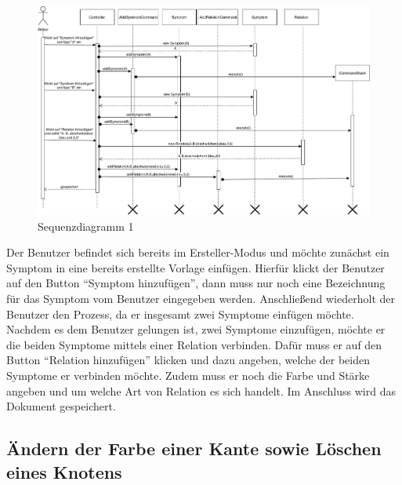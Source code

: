 \documentclass[enabledeprecatedfontcommands,fontsize=12pt,paper=a4,twoside,parskip=half]{scrartcl}
\begin{document}
\begin{figure}[H]
    \centering
    \includegraphics[width=\textwidth]{Bilder/SyndromansatzSWP.pdf}
    \caption{Sequenzdiagramm 1}
    \label{fig:SyndromansatzSWP}
\end{figure}
Der Benutzer befindet sich bereits im Ersteller-Modus und möchte zunächst ein Symptom in eine bereits erstellte Vorlage einfügen. Hierfür klickt der Benutzer auf den Button \enquote{Symptom hinzufügen}, dann muss nur noch eine Bezeichnung für das Symptom vom Benutzer eingegeben werden. Anschließend wiederholt der Benutzer den Prozess, da er insgesamt zwei Symptome einfügen möchte. Nachdem es dem Benutzer gelungen ist, zwei Symptome einzufügen, möchte er die beiden Symptome mittels einer Relation verbinden. Dafür muss er auf den Button \enquote{Relation hinzufügen} klicken und dazu angeben, welche der beiden Symptome er verbinden möchte. Zudem muss er noch die Farbe und Stärke angeben und um welche Art von Relation es sich handelt. Im Anschluss wird das Dokument gespeichert.
\newpage

\subsection{Ändern der Farbe einer Kante sowie Löschen eines Knotens}
\end{document}
